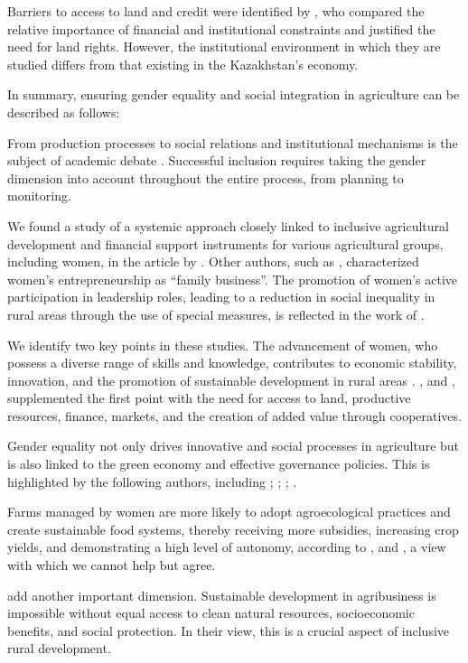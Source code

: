 ﻿\documentclass[pdflatex,sn-mathphys-ay]{sn-jnl}
\begin{document}
Barriers to access to land and credit were identified by
\citep{ref26,ref20,ref06}, who compared the
relative importance of financial and institutional constraints and
justified the need for land rights. However, the institutional
environment in which they are studied differs from that existing in the
Kazakhstan's economy.

In summary, ensuring gender equality and social integration in
agriculture can be described as follows:

From production processes to social relations and institutional
mechanisms is the subject of academic debate \citep{ref78,ref93,ref04}. Successful inclusion
requires taking the gender dimension into account throughout the entire
process, from planning to monitoring.

We found a study of a systemic approach closely linked to inclusive
agricultural development and financial support instruments for various
agricultural groups, including women, in the article by \citet{ref48}. Other authors, such as \citet{ref11},
characterized women's entrepreneurship as ``family business''. The
promotion of women's active participation in leadership roles, leading
to a reduction in social inequality in rural areas through the use of
special measures, is reflected in the work of \citet{ref82}.

We identify two key points in these studies. The advancement of women,
who possess a diverse range of skills and knowledge, contributes to
economic stability, innovation, and the promotion of sustainable
development in rural areas \citep{ref82}. \citet{ref75}, and \citet{ref02}, supplemented the first point
with the need for access to land, productive resources, finance,
markets, and the creation of added value through cooperatives.

Gender equality not only drives innovative and social processes in
agriculture but is also linked to the green economy and effective
governance policies. This is highlighted by the following authors,
including \citet{ref57}; \citet{ref31}; \citet{ref05}; \citet{ref106}.

Farms managed by women are more likely to adopt agroecological practices
and create sustainable food systems, thereby receiving more subsidies,
increasing crop yields, and demonstrating a high level of autonomy,
according to \citet{ref67}, and \citet{ref50},
a view with which we cannot help but agree.

\citet{ref92} add another important dimension.
Sustainable development in agribusiness is impossible without equal
access to clean natural resources, socioeconomic benefits, and social
protection. In their view, this is a crucial aspect of inclusive rural
development.
\end{document}
